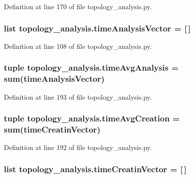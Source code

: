 Definition at line 170 of file topology\-\_\-analysis.\-py.

\hypertarget{a00128_a3ddbda333425be797470f7d058e2c8a4}{
\subsubsection[{time\-Analysis\-Vector}]{\setlength{\rightskip}{0pt plus 5cm}list topology\-\_\-analysis.\-time\-Analysis\-Vector = \mbox{[}$\,$\mbox{]}}}\label{a00128_a3ddbda333425be797470f7d058e2c8a4}


Definition at line 108 of file topology\-\_\-analysis.\-py.

\hypertarget{a00128_a0689e49982e7bedba8ac4eb5534963db}{
\subsubsection[{time\-Avg\-Analysis}]{\setlength{\rightskip}{0pt plus 5cm}tuple topology\-\_\-analysis.\-time\-Avg\-Analysis = {\bf sum}({\bf time\-Analysis\-Vector})}}\label{a00128_a0689e49982e7bedba8ac4eb5534963db}


Definition at line 193 of file topology\-\_\-analysis.\-py.

\hypertarget{a00128_a4cd61f10a5a0a8d80608e71a1fc2009c}{
\subsubsection[{time\-Avg\-Creation}]{\setlength{\rightskip}{0pt plus 5cm}tuple topology\-\_\-analysis.\-time\-Avg\-Creation = {\bf sum}({\bf time\-Creatin\-Vector})}}\label{a00128_a4cd61f10a5a0a8d80608e71a1fc2009c}


Definition at line 192 of file topology\-\_\-analysis.\-py.

\hypertarget{a00128_a0527a0989312340a402661aebc675d30}{
\subsubsection[{time\-Creatin\-Vector}]{\setlength{\rightskip}{0pt plus 5cm}list topology\-\_\-analysis.\-time\-Creatin\-Vector = \mbox{[}$\,$\mbox{]}}}\label{a00128_a0527a0989312340a402661aebc675d30}



